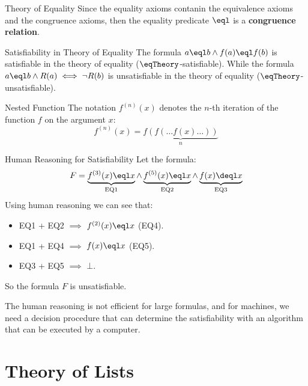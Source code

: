 \begin{remark}{Theory of Equality}
    Since the equality axioms contanin the equivalence axioms and 
    the congruence axioms, then the equality predicate $\eql$ is
    a \textbf{congruence relation}.
\end{remark}

\begin{example}{Satisfiability in Theory of Equality}
    The formula $a \eql b \land f(a) \eql f(b)$ is
    satisfiable in the theory of equality ($\eqTheory$-satisfiable).
    While the formula $a \eql b \land R(a) \iff \neg R(b)$ is
    unsatisfiable in the theory of equality
    ($\eqTheory$-unsatisfiable).
\end{example}

\begin{notation}{Nested Function}
    The notation $f^{(n)}(x)$ denotes the 
    $n$-th iteration of the function $f$ on the argument $x$:
    \begin{equation*}
        f^{(n)}(x) = \underbrace{f(f(\dots f(x) \dots))}_{n}
    \end{equation*}
\end{notation}

\begin{example}{Human Reasoning for Satisfiability}
    Let the formula:
    \begin{equation*}
        F = \underbrace{f^{(3)}(x) \eql x}_{\text{EQ1}} \land
        \underbrace{f^{(5)}(x) \eql x}_{\text{EQ2}} \land 
        \underbrace{f(x) \deql x}_{\text{EQ3}}
    \end{equation*}
    Using human reasoning we can see that:
    \begin{itemize}
        \item EQ1 + EQ2 $\implies$ $f^{(2)}(x) \eql x$ (EQ4).
        \item EQ1 + EQ4 $\implies$ $f(x) \eql x$ (EQ5).
        \item EQ3 + EQ5 $\implies$ $\bot$.
    \end{itemize}
    So the formula $F$ is unsatisfiable.
\end{example}

The human reasoning is not efficient for large formulas, and 
for machines, we need a decision procedure that can determine
the satisfiability with an algorithm that can be executed by a computer.

\section{Theory of Lists}

